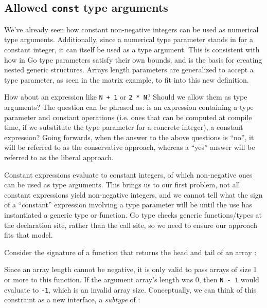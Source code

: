 \subsection{Allowed \texttt{const} type arguments}

We've already seen how constant non-negative integers can be used as numerical
type arguments. Additionally, since a numerical type parameter stands in for a
constant integer, it can itself be used as a type argument. This is consistent
with how in Go type parameters satisfy their own bounds, and is the basis for
creating nested generic structures. Arrays length parameters are generalized to
accept a  type parameter, as seen in the matrix example, to fit into
this new definition.

How about an expression like \texttt{N + 1} or \texttt{2 * N}? Should we allow
them as  type arguments? The question can be phrased as: is an
expression containing a  type parameter and constant operations (i.e.
ones that can be computed at compile time, if we substitute the type parameter
for a concrete integer), a constant expression? Going forwards, when the answer
to the above questions is ``no'', it will be referred to as the conservative
approach, whereas a ``yes'' answer will be referred to as the liberal approach.


Constant expressions evaluate to constant integers, of which non-negative ones
can be used as  type arguments. This brings us to our first problem,
not all constant expressions yield non-negative integers, and we cannot tell
what the sign of a ``constant'' expression involving a type parameter will be
until the use has instantiated a generic type or function. Go type checks
generic functions/types at the declaration site, rather than the call site, so
we need to ensure our approach fits that model.

Consider the signature of a function that returns the head and tail of an array
\autocite{rustConstBlog}:


Since an array length cannot be negative, it is only valid to pass arrays of
size 1 or more to this function. If the argument array's length was 0, then
\texttt{N - 1} would evaluate to \texttt{-1}, which is an invalid array size.
Conceptually, we can think of this constraint as a new interface, a
\emph{subtype} of :

